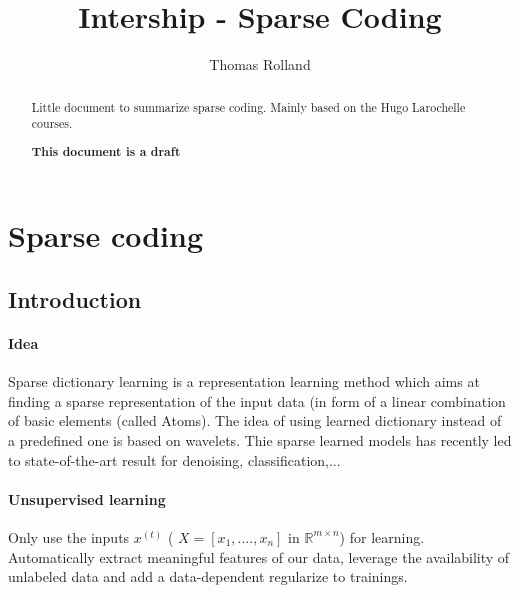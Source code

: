 \documentclass[a4paper,10pt]{article}
\title{Intership - Sparse Coding}
\author{Thomas Rolland}
\date{}%
\newcommand{\R}{\mathbb{R}}
\begin{document}
\maketitle

\begin{abstract}
Little document to summarize sparse coding. Mainly based on the Hugo Larochelle courses.\\
\begin{center}

\textbf{This document is a draft }
 
\end{center}
\end{abstract}
\tableofcontents
\section{Sparse coding}
\subsection{Introduction}
\paragraph{Idea} Sparse dictionary learning is a representation learning method which aims at finding a sparse representation of the input data (in form of a linear combination of basic elements (called Atoms). The idea of using learned dictionary instead of a predefined one is based on wavelets. Thie sparse learned models has recently led to state-of-the-art result for denoising, classification,...
\paragraph{Unsupervised learning} Only use the inputs $x^{(t)}$ ( $X = [x_1,....,x_n]$ in $\R^{m \times n}$) for learning. Automatically extract meaningful features of our data, leverage the availability of unlabeled data and add a data-dependent regularize to trainings.\\
\end{document}
